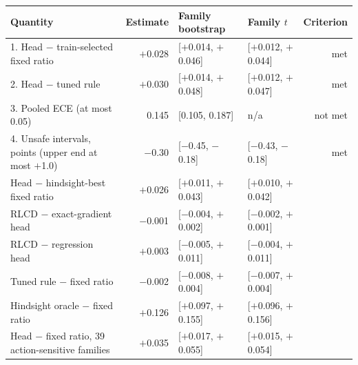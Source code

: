 \begin{tabular}{lrllr}
\toprule
Quantity & Estimate & Family bootstrap & Family $t$ & Criterion \\
\midrule
1. Head $-$ train-selected fixed ratio & $+$0.028 & [$+$0.014, $+$0.046] & [$+$0.012, $+$0.044] & met \\
2. Head $-$ tuned rule & $+$0.030 & [$+$0.014, $+$0.048] & [$+$0.012, $+$0.047] & met \\
3. Pooled ECE (at most 0.05) & 0.145 & [0.105, 0.187] & n/a & not met \\
4. Unsafe intervals, points (upper end at most $+$1.0) & $-$0.30 & [$-$0.45, $-$0.18] & [$-$0.43, $-$0.18] & met \\
\midrule
Head $-$ hindsight-best fixed ratio & $+$0.026 & [$+$0.011, $+$0.043] & [$+$0.010, $+$0.042] &  \\
RLCD $-$ exact-gradient head & $-$0.001 & [$-$0.004, $+$0.002] & [$-$0.002, $+$0.001] &  \\
RLCD $-$ regression head & $+$0.003 & [$-$0.005, $+$0.011] & [$-$0.004, $+$0.011] &  \\
Tuned rule $-$ fixed ratio & $-$0.002 & [$-$0.008, $+$0.004] & [$-$0.007, $+$0.004] &  \\
Hindsight oracle $-$ fixed ratio & $+$0.126 & [$+$0.097, $+$0.155] & [$+$0.096, $+$0.156] &  \\
Head $-$ fixed ratio, 39 action-sensitive families & $+$0.035 & [$+$0.017, $+$0.055] & [$+$0.015, $+$0.054] &  \\
\bottomrule
\end{tabular}
